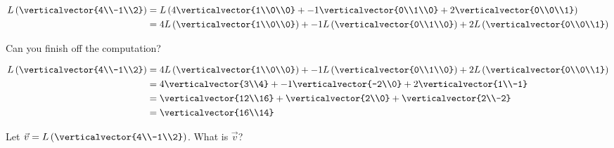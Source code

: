 \documentclass{ximera}
\begin{document}
\begin{question}
\begin{solution}
\begin{hint}
\begin{question}
  		\begin{align*}
  			L\left(\verticalvector{4\\-1\\2}\right) &= L\left( 4\verticalvector{1\\0\\0}+-1\verticalvector{0\\1\\0}+2\verticalvector{0\\0\\1} \right)\\
  			&= 4L\left(\verticalvector{1\\0\\0}\right)+-1L\left(\verticalvector{0\\1\\0}\right)+2L\left(\verticalvector{0\\0\\1}\right)
  		\end{align*}
  		
  		Can you finish off the computation?
              \end{question}
  	\end{hint}
  	\begin{hint}
  		\begin{align*}
  			 L \left(\verticalvector{4\\-1\\2}\right) &= 4L\left(\verticalvector{1\\0\\0}\right)+-1L\left(\verticalvector{0\\1\\0}\right)+2L\left(\verticalvector{0\\0\\1}\right)\\
  			&= 4\verticalvector{3\\4}+-1\verticalvector{-2\\0}+2\verticalvector{1\\-1}\\
  			&= \verticalvector{12\\16}+\verticalvector{2\\0}+\verticalvector{2\\-2}\\
  			&= \verticalvector{16\\14}
  		\end{align*}
  	\end{hint}

    Let $\vec{v} = L \left(\verticalvector{4\\-1\\2}\right)$.  What is $\vec{v}$?


\end{solution}
\end{question}
\end{document}
